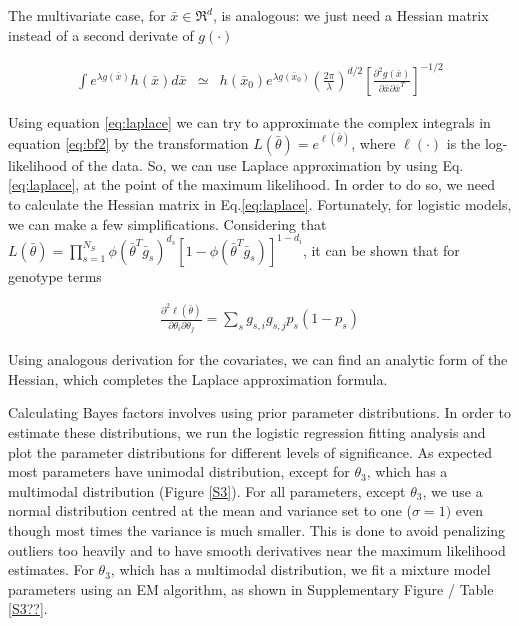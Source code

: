 The multivariate case, for $\bar{x} \in \Re^d$, is analogous: we just need a Hessian matrix instead of a second derivate of $g(\cdot)$

\begin{eqnarray}\label{eq:laplace}
	\int{e^{\lambda g(\bar{x})} h(\bar{x}) d\bar{x}} & \simeq & h(\bar{x}_0) e^{\lambda g(\bar{x}_0)} 
	\left( \frac{2 \pi}{\lambda} \right)^{d/2} \left[ \frac{\partial^2 g(\bar{x}) }{\partial \bar{x} \partial \bar{x}^T} \right] ^{-1/2}
\end{eqnarray}

Using equation \ref{eq:laplace} we can try to approximate the complex integrals in equation \ref{eq:bf2} by the transformation $L(\bar{\theta}) = e^{\ell(\bar{\theta})}$, where $\ell(\cdot)$ is the log-likelihood of the data. So, we can use Laplace approximation by using Eq.\ref{eq:laplace}, at the point of the maximum likelihood. In order to do so, we need to calculate the Hessian matrix in Eq.\ref{eq:laplace}. Fortunately, for logistic models, we can make a few simplifications. Considering that $L(\bar{\theta}) = \prod_{s=1}^{N_S}{ \phi( \bar{\theta}^T \bar{g}_s)^{d_s} [ 1-\phi( \bar{\theta}^T \bar{g}_s) ]^{1-d_i} }$, it can be shown that for genotype terms

\begin{eqnarray*}
	\frac{ \partial^2 \ell(\bar{\theta}) }{ \partial\theta_i \partial\theta_j } 
	= \sum_s{ g_{s,i} g_{s,j} p_s (1-p_s) } 
\end{eqnarray*}

Using analogous derivation for the covariates, we can find an analytic form of the Hessian, which completes the Laplace approximation formula.

Calculating Bayes factors involves using prior parameter distributions. In order to estimate these distributions, we run the logistic regression fitting analysis and plot the parameter distributions for different levels of significance. As expected most parameters have unimodal distribution, except for $\theta_3$, which has a multimodal distribution (Figure \ref{S3}). For all parameters, except $\theta_3$, we use a normal distribution centred at the mean and variance set to one ($\sigma=1)$ even though most times the variance is much smaller. This is done to avoid penalizing outliers too heavily and to have smooth derivatives near the maximum likelihood estimates. For $\theta_3$, which has a multimodal distribution, we fit a mixture model parameters using an EM algorithm, as shown in Supplementary Figure / Table \ref{S3??}.


